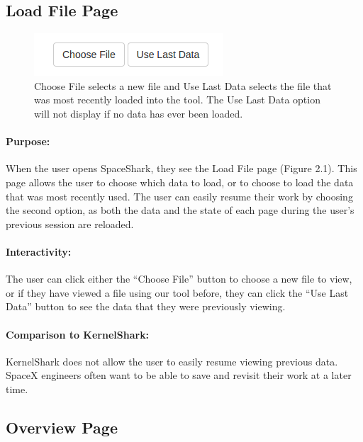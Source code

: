 \documentclass{hmcclinic}
\begin{document}
\subsection{Load File Page}

\begin{figure}[H]
  \centering
      \includegraphics[scale=0.75]{loadFile-buttons.png}
  \caption{Choose File selects a new file and Use Last Data selects the file
  that was most recently loaded into the tool. The Use Last Data option will not
display if no data has ever been loaded.}
  \end{figure}

\paragraph{Purpose:}
When the user opens SpaceShark, they see the Load File page (Figure 2.1).  This
page allows the user to choose which data to load, or to choose to load the data
that was most recently used.  The user can easily resume their work by choosing
the second option, as both the data and the state of each page during the user's
previous session are reloaded.

\paragraph{Interactivity:}
The user can click either the ``Choose File'' button to choose a new file to view, or if they have viewed a file using our tool before, they can click the ``Use Last Data'' button to see the data that they were previously viewing.

\paragraph{Comparison to KernelShark:}
KernelShark does not allow the user to easily resume viewing previous data. SpaceX engineers often want to be able to save and revisit their work at a later time. 


  \subsection{Overview Page} 
  
\end{document}

